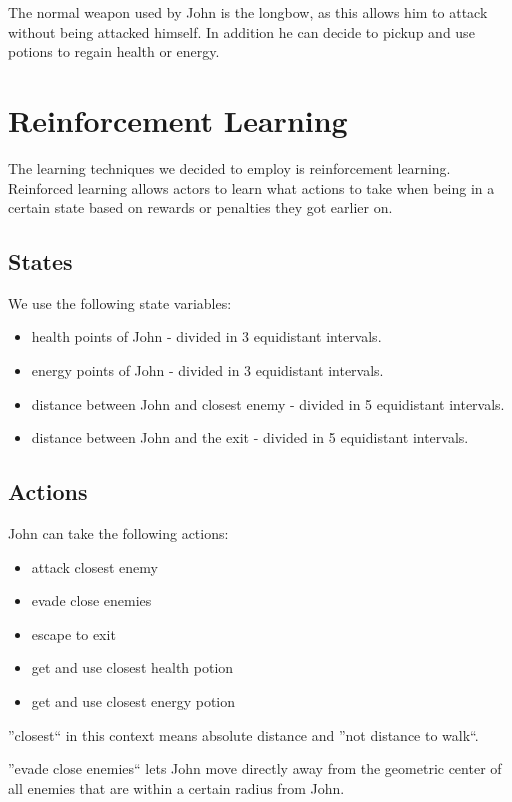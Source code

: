 \documentclass[a4paper,10pt]{scrartcl}
\begin{document}
The normal weapon used by John is the longbow, as this allows him to attack without being attacked himself. In addition he can decide to pickup and use potions to regain health or energy.

\section{Reinforcement Learning}\label{sec:rl}
The learning techniques we decided to employ is reinforcement learning. Reinforced learning allows actors to learn what actions to take when being in a certain state based on rewards or penalties they got earlier on.


\subsection{States}
We use the following state variables:
\begin{itemize}
 \item health points of John - divided in 3 equidistant intervals.
 \item energy points of John - divided in 3 equidistant intervals.
 \item distance between John and closest enemy  - divided in 5 equidistant intervals.
 \item distance between John and the exit - divided in 5 equidistant intervals.
\end{itemize}

\subsection{Actions}
John can take the following actions:
\begin{itemize}
 \item attack closest enemy
 \item evade close enemies
 \item escape to exit
 \item get and use closest health potion
 \item get and use closest energy potion
\end{itemize}

''closest`` in this context means absolute distance and ''not distance to walk``.

''evade close enemies`` lets John move directly away from the geometric center of all enemies that are within a certain radius from John.
\end{document}
